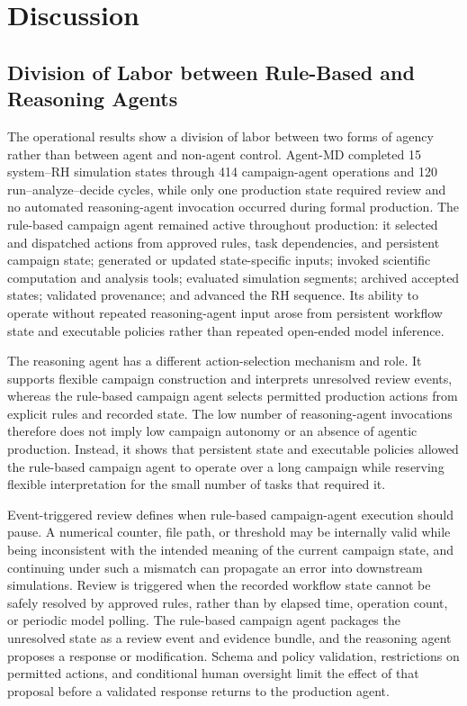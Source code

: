 \section{Discussion}

\subsection{Division of Labor between Rule-Based and Reasoning Agents}

The operational results show a division of labor between two forms of agency rather than between agent and non-agent control. Agent-MD completed 15 system--RH simulation states through 414 campaign-agent operations and 120 run--analyze--decide cycles, while only one production state required review and no automated reasoning-agent invocation occurred during formal production. The rule-based campaign agent remained active throughout production: it selected and dispatched actions from approved rules, task dependencies, and persistent campaign state; generated or updated state-specific inputs; invoked scientific computation and analysis tools; evaluated simulation segments; archived accepted states; validated provenance; and advanced the RH sequence. Its ability to operate without repeated reasoning-agent input arose from persistent workflow state and executable policies rather than repeated open-ended model inference.

The reasoning agent has a different action-selection mechanism and role. It supports flexible campaign construction and interprets unresolved review events, whereas the rule-based campaign agent selects permitted production actions from explicit rules and recorded state. The low number of reasoning-agent invocations therefore does not imply low campaign autonomy or an absence of agentic production. Instead, it shows that persistent state and executable policies allowed the rule-based campaign agent to operate over a long campaign while reserving flexible interpretation for the small number of tasks that required it.

Event-triggered review defines when rule-based campaign-agent execution should pause. A numerical counter, file path, or threshold may be internally valid while being inconsistent with the intended meaning of the current campaign state, and continuing under such a mismatch can propagate an error into downstream simulations. Review is triggered when the recorded workflow state cannot be safely resolved by approved rules, rather than by elapsed time, operation count, or periodic model polling. The rule-based campaign agent packages the unresolved state as a review event and evidence bundle, and the reasoning agent proposes a response or modification. Schema and policy validation, restrictions on permitted actions, and conditional human oversight limit the effect of that proposal before a validated response returns to the production agent.

